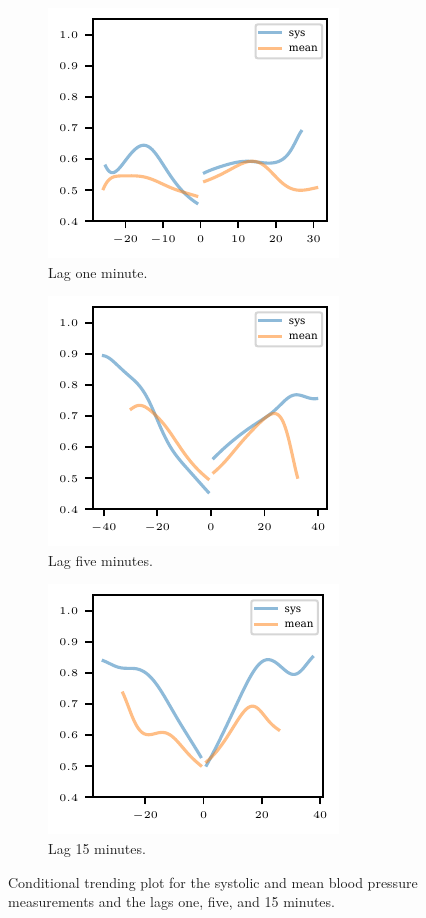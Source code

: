 \begin{figure}
    \centering
    \begin{subfigure}[t]{.32\textwidth}
        \includegraphics{plots/mimic/cond_prob_diff_nbp_abp_lag1}
        \caption{Lag one minute.}
    \end{subfigure}\hspace{0.01\textwidth}
    \begin{subfigure}[t]{.32\textwidth}
        \includegraphics{plots/mimic/cond_prob_diff_nbp_abp_lag5}
        \caption{Lag five minutes.}
    \end{subfigure}\hspace{0.01\textwidth}
    \begin{subfigure}[t]{.32\textwidth}
        \includegraphics{plots/mimic/cond_prob_diff_nbp_abp_lag15}
        \caption{Lag 15 minutes.}
    \end{subfigure}\hspace{0.01\textwidth}
    \caption{Conditional trending plot for the systolic and mean blood pressure measurements and the lags one, five, and 15 minutes. }
    \label{fig:app-mimic-cond-prob}
\end{figure}




